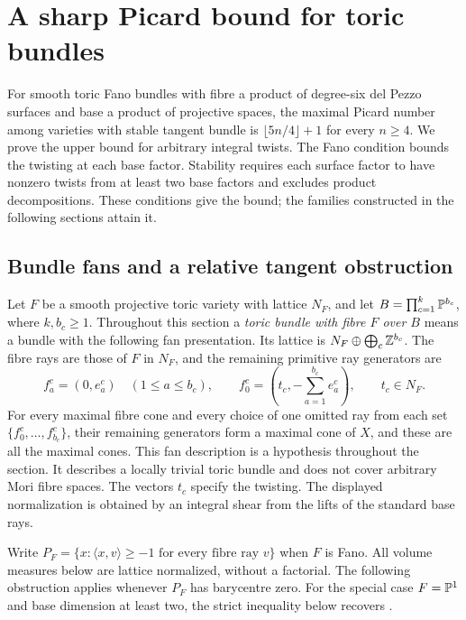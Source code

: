 \section{A sharp Picard bound for toric bundles}\label{sec:interactions}

For smooth toric Fano bundles with fibre a product of degree-six del Pezzo surfaces
and base a product of projective spaces, the maximal Picard number among
varieties with stable tangent bundle is $\lfloor5n/4\rfloor+1$
for every $n\ge4$. We prove the upper bound for arbitrary integral
twists. The Fano condition bounds the twisting at each base factor.
Stability requires each surface factor to have nonzero twists from at
least two base factors and excludes product decompositions. These
conditions give the bound; the families constructed in the following
sections attain it.

\subsection{Bundle fans and a relative tangent obstruction}
Let $F$ be a smooth projective toric variety with lattice $N_F$, and let
$B=\prod_{c=1}^k\mathbb{P}^{b_c}$, where $k,b_c\ge1$. Throughout this section a
\emph{toric bundle with fibre $F$ over $B$} means a bundle with the
following fan presentation. Its lattice is $N_F\oplus\bigoplus_c\mathbb{Z}^{b_c}$.
The fibre rays are those of $F$ in $N_F$, and the remaining primitive
ray generators are
\begin{equation}\label{interact:rays}
 f^c_a=(0,e^c_a)\quad(1\le a\le b_c),\qquad
 f^c_0=\left(t_c,-\sum_{a=1}^{b_c}e^c_a\right),\qquad t_c\in N_F.
\end{equation}
For every maximal fibre cone and every choice of one omitted ray from
each set $\{f^c_0,\ldots,f^c_{b_c}\}$, their remaining generators form
a maximal cone of $X$, and these are all the maximal cones.
This fan description is a hypothesis throughout the section. It describes
a locally trivial toric bundle
\cite[Theorem~3.3.19]{CoxLittleSchenck2011} and does not cover arbitrary
Mori fibre spaces.
The vectors $t_c$ specify the twisting. The displayed normalization is
obtained by an integral shear from the lifts of the standard base rays.

Write $P_F=\{x:\langle x,v\rangle\ge-1\text{ for every fibre ray }v\}$
when $F$ is Fano. All volume measures below are lattice normalized,
without a factorial. The following obstruction applies whenever $P_F$
has barycentre zero. For the special case $F=\mathbb{P}^1$ and base dimension
at least two, the strict inequality below recovers
\cite[Theorem~8.1]{BiswasDeyGencPoddar2021}.

